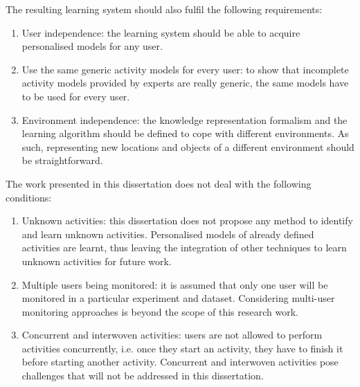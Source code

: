 The resulting learning system should also fulfil the following requirements:

\begin{enumerate}
 \item User independence: the learning system should be able to acquire personalised models for any user.
 \item Use the same generic activity models for every user: to show that incomplete activity models provided by experts are really generic, the same models have to be used for every user.
 \item Environment independence: the knowledge representation formalism and the learning algorithm should be defined to cope with different environments. As such, representing new locations and objects of a different environment should be straightforward.
\end{enumerate}


The work presented in this dissertation does not deal with the following conditions:

\begin{enumerate}
 \item Unknown activities: this dissertation does not propose any method to identify and learn unknown activities. Personalised models of already defined activities are learnt, thus leaving the integration of other techniques to learn unknown activities for future work.
 \item Multiple users being monitored: it is assumed that only one user will be monitored in a particular experiment and dataset. Considering multi-user monitoring approaches is beyond the scope of this research work.
 \item Concurrent and interwoven activities: users are not allowed to perform activities concurrently, i.e. once they start an activity, they have to finish it before starting another activity. Concurrent and interwoven activities pose challenges that will not be addressed in this dissertation.
\end{enumerate}



